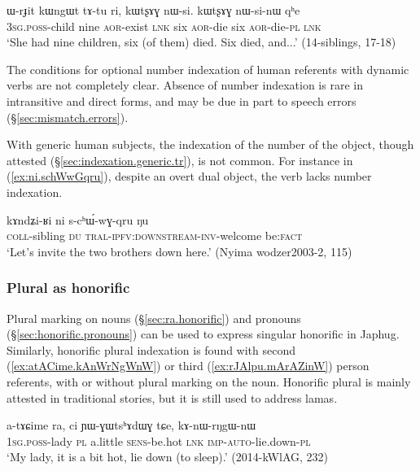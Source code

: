 \begin{exe}
\ex \label{ex:kWtsxAG.nWsi}
\gll ɯ-rɟit kɯngɯt tɤ-tu ri, kɯtʂɤɣ nɯ-si. kɯtʂɤɣ nɯ-si-nɯ qʰe \\
\textsc{3sg}.\textsc{poss}-child nine \textsc{aor}-exist \textsc{lnk} six \textsc{aor}-die six \textsc{aor}-die-\textsc{pl} \textsc{lnk} \\
\glt `She had nine children, six (of them) died. Six died, and...' (14-siblings, 17-18)
\end{exe}

The conditions for optional number indexation of human referents with dynamic verbs are not completely clear. Absence of number indexation is rare in intransitive and direct forms, and may be due in part to speech errors (§\ref{sec:mismatch.errors}).


With generic human subjects, the indexation of the number of the object, though attested (§\ref{sec:indexation.generic.tr}), is not common. For instance in (\ref{ex:ni.schWwGqru}), despite an overt dual object, the verb lacks number indexation.

\begin{exe}
\ex \label{ex:ni.schWwGqru}
\gll kɤndʑi-ʁi ni s-cʰɯ́-wɣ-qru ŋu \\
\textsc{coll}-sibling \textsc{du} \textsc{tral}-\textsc{ipfv}:\textsc{downstream}-\textsc{inv}-welcome be:\textsc{fact} \\
\glt `Let's invite the two brothers down here.' (Nyima wodzer2003-2, 115)
\end{exe} 
 
 
\subsubsection{Plural as honorific} \label{sec:honorific.indexation}
Plural marking on nouns (§\ref{sec:ra.honorific}) and pronouns (§\ref{sec:honorific.pronouns}) can be used to express singular honorific in Japhug. Similarly, honorific plural indexation is found with second (\ref{ex:atACime.kAnWrNgWnW}) or third (\ref{ex:rJAlpu.mArAZinW}) person referents, with or without plural  marking on the noun. Honorific plural is mainly attested in traditional stories, but it is still used to address lamas.

\begin{exe}
\ex \label{ex:atACime.kAnWrNgWnW}
\gll a-tɤɕime ra, ci ɲɯ-ɣɯtsʰɤdɯɣ tɕe, kɤ-nɯ-rŋgɯ-nɯ \\
\textsc{1sg}.\textsc{poss}-lady \textsc{pl} a.little \textsc{sens}-be.hot \textsc{lnk} \textsc{imp}-\textsc{auto}-lie.down-\textsc{pl} \\
\glt `My lady, it is a bit hot, lie down (to sleep).' (2014-kWlAG, 232)
\end{exe}

